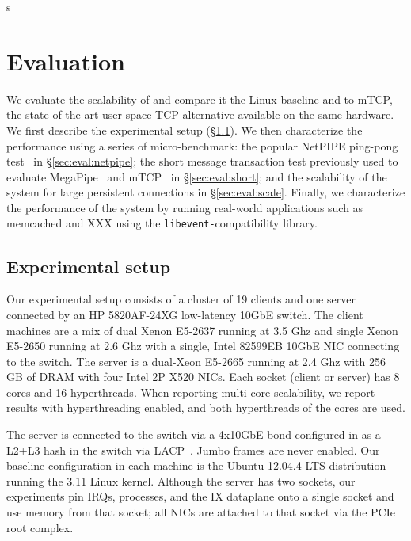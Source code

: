 s
\section{Evaluation}
\label{sec:eval}

We evaluate the scalability of \ix and compare it the Linux baseline
and to mTCP, the state-of-the-art user-space TCP alternative available
on the same hardware.  We first describe the experimental setup
(\S\ref{sec:eval:setup}).  We then characterize the performance using
a series of micro-benchmark: the popular NetPIPE ping-pong
test~\cite{snell1996netpipe} in \S\ref{sec:eval:netpipe}; the short
message transaction test previously used to evaluate
MegaPipe~\cite{han2012megapipe} and mTCP~\cite{jeong2014mtcp} in
\S\ref{sec:eval:short}; and the scalability of the system for large
persistent connections in \S\ref{sec:eval:scale}.  Finally, we
characterize the performance of the \ix system by running real-world
applications such as memcached and XXX using the
\texttt{libevent-}compatibility library.


\subsection{Experimental setup}
\label{sec:eval:setup}

Our experimental setup consists of a cluster of 19 clients and one
server connected by an HP 5820AF-24XG low-latency 10GbE switch.  The client
machines are a mix of dual Xenon E5-2637 running at 3.5 Ghz and single Xenon E5-2650 running at 2.6 Ghz with a single, Intel
82599EB 10GbE NIC connecting to the switch.  The server is a dual-Xeon E5-2665
running at 2.4 Ghz with 256 GB of DRAM with four Intel 2P X520 NICs.  Each
socket (client or server) has 8 cores and 16 hyperthreads.  When
reporting multi-core scalability, we report results with
hyperthreading enabled, and both hyperthreads of the cores are used.

The server is connected to
the switch via a 4x10GbE bond configured in as a L2+L3
hash in the switch via LACP~\cite{ieee802.3ad}.  Jumbo
frames are never enabled.  Our baseline configuration in each machine
is the Ubuntu 12.04.4 LTS distribution running the 3.11 Linux kernel.  Although
the server has two sockets, our experiments pin IRQs, processes, and
the IX dataplane onto a single socket and use memory from that socket;
all NICs are attached to that socket via the PCIe root complex. 

